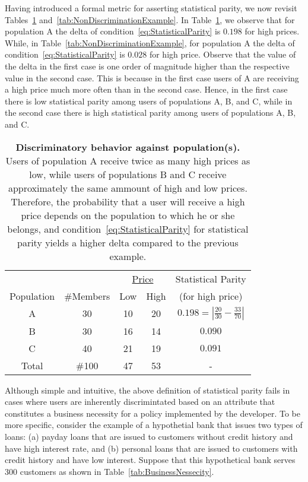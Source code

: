Having introduced a formal metric for asserting statistical parity, we now
revisit Tables~\ref{tab:DiscriminationExample}
and~\ref{tab:NonDiscriminationExample}.
In Table~\ref{tab:DiscriminationExample}, we observe that for population A the
delta of condition~\ref{eq:StatisticalParity} is $0.198$ for high prices.
While, in Table~\ref{tab:NonDiscriminationExample}, for population A the delta
of condition~\ref{eq:StatisticalParity} is $0.028$ for high price. Observe that
the value of the delta in the first case is one order of magnitude higher than
the respective value in the second case. This is because in the first case
users of A are receiving a high price much more often than in the second case.
Hence, in the first case there is low statistical parity among users of
populations A, B, and C, while in the second case there is high statistical
parity among users of populations A, B, and C.

\begin{table}[t]
{
 \scriptsize
  \renewcommand{\arraystretch}{1.5}
  \begin{tabular}{ c | c | c  c | c }
    & & \multicolumn{2}{|c|}{\underline{Price}} &  Statistical Parity\\
    Population & \#Members & Low & High & (for high price) \\
    \hline
    A & 30 &  10 & 20 & $0.198 = | \frac{20}{30} - \frac{33}{70}|$ \\
    B & 30 &  16 & 14 & $0.090$ \\
    C & 40 &  21 & 19 & $0.091$ \\
    \hline
    Total & \#100 & 47 & 53 & - \\
  \end{tabular}
  \caption{{\bf Discriminatory behavior against population(s).} Users of
    population A receive twice as many high prices as low, while users of
    populations B and C receive approximately the same ammount of high and low
    prices. Therefore, the probability that a user will receive a high price
    depends on the population to which he or she belongs, and
    condition~\ref{eq:StatisticalParity} for statistical parity yields a higher
    delta compared to the previous example.
  }
  \label{tab:DiscriminationExample}
}
\end{table}

Although simple and intuitive, the above definition of statistical parity fails
in cases where users are inherently discrimintated based on an attribute that
constitutes a business necessity for a policy implemented by the developer.
To be more specific, consider the example of a hypothetial bank that issues two
types of loans: (a) payday loans that are issued to customers without credit
history and have high interest rate, and (b) personal loans that are issued to
customers with credit history and have low interest. Suppose that this
hypothetical bank serves 300 customers as shown in
Table~\ref{tab:BusinessNessecity}.

